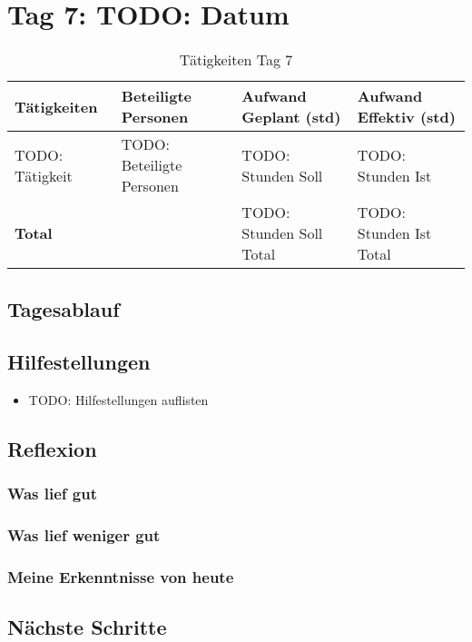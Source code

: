\section{Tag 7: TODO: Datum}
\begin{table}[H]
    \begin{tabular}{|L{0.4\textwidth}|C{60pt}|C{60pt}|C{60pt}|}
        \hline
        \color{white}Tätigkeiten & \color{white}Beteiligte \color{white}Personen & \color{white}Aufwand Geplant (std) & \color{white}Aufwand Effektiv (std) \\
        \hline
        TODO: Tätigkeit & TODO: Beteiligte Personen & TODO: Stunden Soll & TODO: Stunden Ist \\
        \hline
        \textbf{Total} & & TODO: Stunden Soll Total & TODO: Stunden Ist Total \\
        \hline
    \end{tabular}
    \caption{Tätigkeiten Tag 7}
\end{table}

\subsection*{Tagesablauf}


\subsection*{Hilfestellungen}
\begin{itemize}
    \item TODO: Hilfestellungen auflisten
\end{itemize}

\subsection*{Reflexion}
\subsubsection*{Was lief gut}

\subsubsection*{Was lief weniger gut}

\subsubsection*{Meine Erkenntnisse von heute}

\subsection*{Nächste Schritte}

\pagebreak
